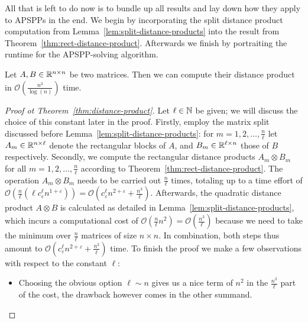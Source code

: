 All that is left to do now is to bundle up all results and lay down how they apply to APSPPs in the end.
We begin by incorporating the split distance product computation from Lemma~\ref{lem:split-distance-products} into the result from Theorem~\ref{thm:rect-distance-product}.
Afterwards we finish by portraiting the runtime for the APSPP-solving algorithm.

\begin{theorem}\label{thm:distance-product}
    Let $A, B \in \mathbb{R}^{n \times n}$ be two matrices.
    Then we can compute their distance product in $\mathcal{O}\left( \frac{n^3}{\log(n)} \right)$ time.
\end{theorem}

\begin{proof}[Proof ot Theorem~\ref{thm:distance-product}]
    Let $\ell \in \mathbb{N}$ be given; we will discuss the choice of this constant later in the proof.
    Firstly, employ the matrix split discussed before Lemma~\ref{lem:split-distance-products}: for $m = 1, 2, \dots, \frac{n}{\ell}$ let $A_m \in \mathbb{R}^{n \times \ell}$ denote the rectangular blocks of $A$, and $B_m \in \mathbb{R}^{\ell \times n}$ those of $B$ respectively.
    Secondly, we compute the rectangular distance products $A_m \otimes B_m$ for all $m = 1, 2, \dots, \frac{n}{\ell}$ according to Theorem~\ref{thm:rect-distance-product}.
    The operation $A_m \otimes B_m$ needs to be carried out $\frac{n}{\ell}$ times, totaling up to a time effort of $\mathcal{O}\left( \frac{n}{\ell} \left( \ell c_\varepsilon^\ell n^{1 + \varepsilon} \right) \right) = \mathcal{O}\left( c_\varepsilon^\ell n^{2 + \varepsilon} + \frac{n^3}{\ell} \right)$.
    Afterwards, the quadratic distance product $A \otimes B$ is calculated as detailed in Lemma~\ref{lem:split-distance-products}, which incurs a computational cost of $\mathcal{O}\left( \frac{n}{\ell} n^2 \right) = \mathcal{O}\left( \frac{n^3}{\ell} \right)$ because we need to take the minimum over $\frac{n}{\ell}$ matrices of size $n \times n$.
    In combination, both steps thus amount to $\mathcal{O}\left( c_\varepsilon^\ell n^{2 + \varepsilon} + \frac{n^3}{\ell} \right)$ time.
    To finish the proof we make a few observations with respect to the constant $\ell$:
    \begin{itemize}
        \item %
            Choosing the obvious option $\ell \sim n$ gives us a nice term of $n^2$ in the $\frac{n^3}{\ell}$ part of the cost, the drawback however comes in the other summand.

\end{itemize}
\end{proof}

